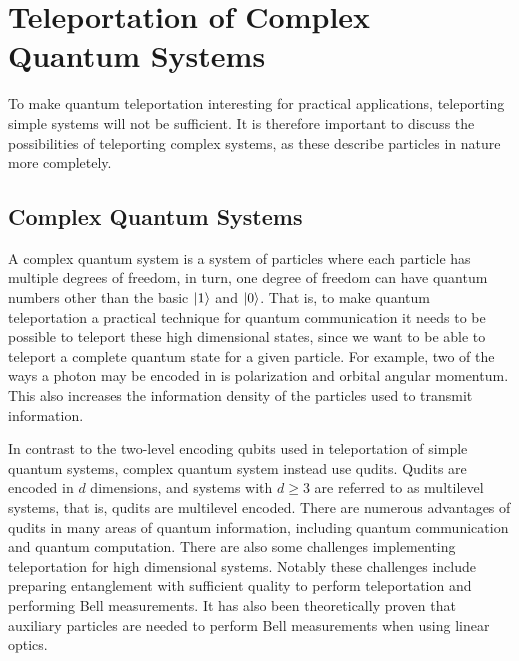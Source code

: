 \section{Teleportation of Complex Quantum Systems}
To make quantum teleportation interesting for practical applications, teleporting simple systems will not be sufficient. It is therefore important to discuss the possibilities of teleporting complex systems, as these describe particles in nature more completely.

\subsection{Complex Quantum Systems}
A complex quantum system is a system of particles where each particle has multiple degrees of freedom, in turn, one degree of freedom can have quantum numbers other than the basic $\ket{1}$ and $\ket{0}$. That is, to make quantum teleportation a practical technique for quantum communication it needs to be possible to teleport these high dimensional states, since we want to be able to teleport a complete quantum state for a given particle. For example, two of the ways a photon may be encoded in is polarization and orbital angular momentum. This also increases the information density of the particles used to transmit information. \cite{Hu:2023}

In contrast to the two-level encoding qubits used in teleportation of simple quantum systems, complex quantum system instead use qudits. Qudits are encoded in $d$ dimensions, and systems with $d\geq 3$ are referred to as multilevel systems, that is, qudits are multilevel encoded. There are numerous advantages of qudits in many areas of quantum information, including quantum communication and quantum computation. There are also some challenges implementing teleportation for high dimensional systems. Notably these challenges include preparing entanglement with sufficient quality to perform teleportation and performing Bell measurements. It has also been theoretically proven that auxiliary particles are needed to perform Bell measurements when using linear optics. \cite{Hu:2023}


